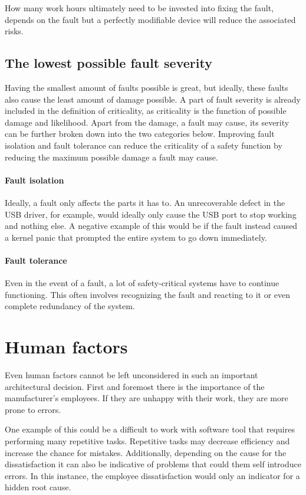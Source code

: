 How many work hours ultimately need to be invested into fixing the fault, depends on the fault but a perfectly modifiable device will reduce the associated risks.
\subsection{The lowest possible fault severity}
Having the smallest amount of faults possible is great, but ideally, these faults also cause the least amount of damage possible. A part of fault severity is already included in the definition of criticality, as criticality is the function of possible damage and likelihood. Apart from the damage, a fault may cause, its severity can be further broken down into the two categories below. Improving fault isolation and fault tolerance can reduce the criticality of a safety function by reducing the maximum possible damage a fault may cause.

\paragraph{Fault isolation}
Ideally,  a fault only affects the parts it has to. An unrecoverable defect in the USB driver, for example, would ideally only cause the USB port to stop working and nothing else. A negative example of this would be if the fault instead caused a kernel panic that prompted the entire system to go down immediately.
\paragraph{Fault tolerance}
Even in the event of a fault, a lot of safety-critical systems have to continue functioning. This often involves recognizing the fault and reacting to it or even complete redundancy of the system.

\section{Human factors}
Even human factors cannot be left unconsidered in such an important architectural decision. First and foremost there is the importance of the manufacturer's employees. If they are unhappy with their work, they are more prone to errors.

One example of this could be a difficult to work with software tool that requires performing many repetitive tasks. Repetitive tasks may decrease efficiency and increase the chance for mistakes. Additionally, depending on the cause for the dissatisfaction it can also be indicative of problems that could them self introduce errors. In this instance, the employee dissatisfaction would only an indicator for a hidden root cause.

